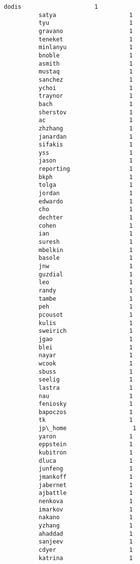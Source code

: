 \documentclass[11pt]{article}
\begin{document}
\begin{Verbatim}[commandchars=\\\{\}]
          dodis                     1
          satya                     1
          tyu                       1
          gravano                   1
          teneket                   1
          minlanyu                  1
          bnoble                    1
          asmith                    1
          mustaq                    1
          sanchez                   1
          ychoi                     1
          traynor                   1
          bach                      1
          sherstov                  1
          ac                        1
          zhzhang                   1
          janardan                  1
          sifakis                   1
          yss                       1
          jason                     1
          reporting                 1
          bkph                      1
          tolga                     1
          jordan                    1
          edwardo                   1
          cho                       1
          dechter                   1
          cohen                     1
          ian                       1
          suresh                    1
          mbelkin                   1
          basole                    1
          jnw                       1
          guzdial                   1
          leo                       1
          randy                     1
          tambe                     1
          peh                       1
          pcousot                   1
          kulis                     1
          sweirich                  1
          jgao                      1
          blei                      1
          nayar                     1
          wcook                     1
          sbuss                     1
          seelig                    1
          lastra                    1
          nau                       1
          feniosky                  1
          bapoczos                  1
          tk                        1
          jp\_home                   1
          yaron                     1
          eppstein                  1
          kubitron                  1
          dluca                     1
          junfeng                   1
          jmankoff                  1
          jabernet                  1
          ajbattle                  1
          nenkova                   1
          imarkov                   1
          nakano                    1
          yzhang                    1
          ahaddad                   1
          sanjeev                   1
          cdyer                     1
          katrina                   1

\end{Verbatim}
\end{document}

